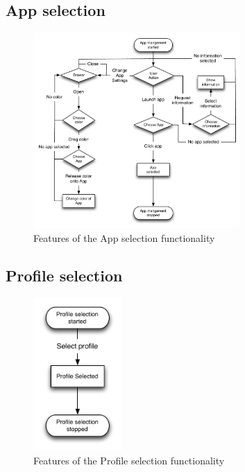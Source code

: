 \subsection{App selection}
\begin{figure}[h]
	\centering
	\includegraphics[width=0.7\textwidth]{gfx/appmanagement.pdf}
	\caption{Features of the App selection functionality}
	\label{fig:appselection_design}
\end{figure}
\subsection{Profile selection}
\begin{figure}[h]
	\centering
	\includegraphics[width=0.3\textwidth]{gfx/profileselect_design.pdf}
	\caption{Features of the Profile selection functionality}
	\label{fig:profileselection_design}
\end{figure}